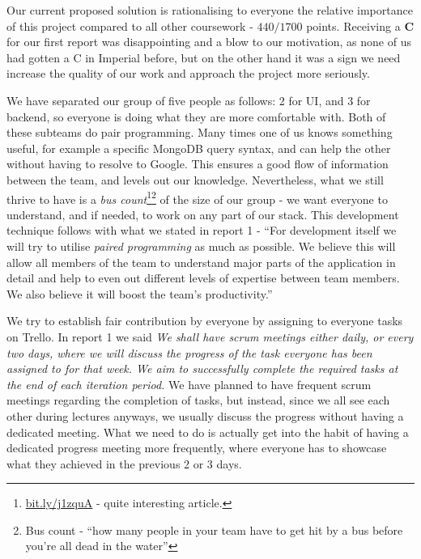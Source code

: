 \documentclass[a4paper,12pt]{article}
\begin{document}
	Our current proposed solution is rationalising to everyone the relative importance of this project compared to all other coursework - $440/1700$ points. Receiving a \textbf{C} for our first report was disappointing and a blow to our motivation, as none of us had gotten a C in Imperial before, but on the other hand it was a sign we need increase the quality of our work and approach the project more seriously.
	
	We have separated our group of five people as follows: 2 for UI, and 3 for backend, so everyone is doing what they are more comfortable with. Both of these subteams do pair programming. Many times one of us knows something useful, for example a specific MongoDB query syntax, and can help the other without having to resolve to Google. This ensures a good flow of information between the team, and levels out our knowledge. Nevertheless, what we still thrive to have is a \emph{bus count}\footnote{\url{bit.ly/j1zquA} - quite interesting article.}\footnote{Bus count - ``how many people in your team have to get hit by a bus before you’re all dead in the water''} of the size of our group - we want everyone to understand, and if needed, to work on any part of our stack. This development technique follows with what we stated in report 1 - ``For development itself we will try to utilise \emph{paired programming} as much as possible. We believe this will allow all members of the team to understand major parts of the application in detail and help to even out different levels of expertise between team members. We also believe it will boost the team's productivity.''
	

	We try to establish fair contribution by everyone by assigning to everyone tasks on Trello. In report 1 we said \emph{We shall have scrum meetings either daily, or every two days, where we will discuss the progress of the task everyone has been assigned to for that week. We aim to successfully complete the required tasks at the end of each iteration period.} We have planned to have frequent scrum meetings regarding the completion of tasks, but instead, since we all see each other during lectures anyways, we usually discuss the progress without having a dedicated meeting. What we need to do is actually get into the habit of having a dedicated progress meeting more frequently, where everyone has to showcase what they achieved in the previous 2 or 3 days.
	
\end{document}
